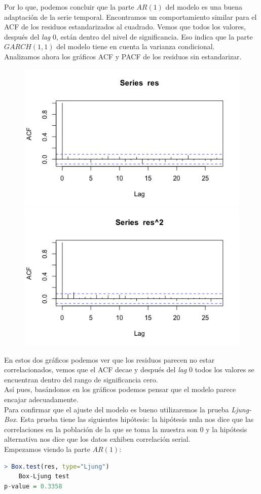 \documentclass[a4paper,]{article}
\begin{document}
Por lo que, podemos concluir que la parte $AR(1)$ del modelo es una buena adaptación de la serie temporal. Encontramos un comportamiento similar para el ACF de los residuos estandarizados al cuadrado. Vemos que todos los valores, después del \textit{lag} 0, están dentro del nivel de significancia. Eso indica que la parte $GARCH(1,1)$ del modelo tiene en cuenta la varianza condicional. \\

Analizamos ahora los gráficos ACF y PACF de los residuos sin estandarizar.
\begin{figure}[H]
    \centering 
    \includegraphics[width=0.4\linewidth]{acfres.png}
    \includegraphics[width=0.4\linewidth]{acfres^2.png}
\end{figure}



En estos dos gráficos podemos ver que los residuos parecen no estar correlacionados, vemos que el ACF decae y después del \textit{lag} 0 todos los valores se encuentran dentro del rango de significancia cero. \\

Así pues, basándonos en los gráficos podemos pensar que el modelo parece encajar adecuadamente. \\

Para confirmar que el ajuste del modelo es bueno utilizaremos la prueba \textit{Ljung-Box}. Esta prueba tiene las siguientes hipótesis: la hipótesis nula nos dice que las correlaciones en la población de la que se toma la muestra son 0 y la hipótesis alternativa nos dice que los datos exhiben correlación serial. \\

Empezamos viendo la parte $AR(1)$:
\begin{lstlisting}[language=R]
> Box.test(res, type="Ljung")
	Box-Ljung test
p-value = 0.3358
\end{lstlisting}
\end{document}
